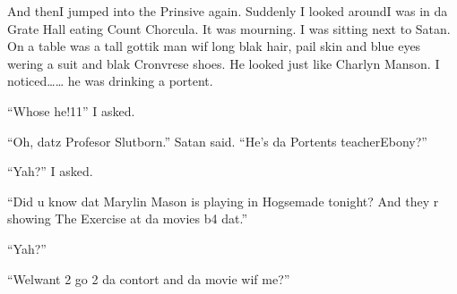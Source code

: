 And then\dotfill I jumped into the Prinsive again.\newline
Suddenly I looked around\dotfill I was in da Grate Hall\newline
eating Count Chorcula. It was mourning. I was sitting next to Satan. On a table was a tall gottik man wif long blak hair, pail skin and blue eyes wering a suit and blak Cronvrese shoes. He looked just like Charlyn Manson. I noticed\ldots{}\ldots{} he was drinking a portent.

\enquote{Whose he!11} I asked.

\enquote{Oh, datz Profesor Slutborn.} Satan said. \enquote{He's da Portents teacher\dotfill Ebony?}

\enquote{Yah?} I asked.

\enquote{Did u know dat Marylin Mason is playing in Hogsemade to\-night? And they r showing The Exercise at da movies b4 dat.}

\enquote{Yah?}

\enquote{Wel\dotfill want 2 go 2 da contort and da movie wif me?}
